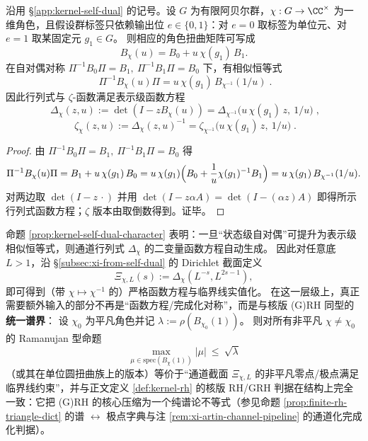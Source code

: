 \begin{proposition}\label{prop:kernel-self-dual-character}
沿用 \S\ref{app:kernel-self-dual} 的记号。设 \(G\) 为有限阿贝尔群，\(\chi:G\to\CC^\times\) 为一维角色，且假设群标签只依赖输出位 \(e\in\{0,1\}\)：对 \(e=0\) 取标签为单位元、对 \(e=1\) 取某固定元 \(g_1\in G\)。
则相应的角色扭曲矩阵可写成
\[
B_\chi(u)=B_0+u\,\chi(g_1)\,B_1.
\]
在自对偶对称 \(\Pi^{-1}B_0\Pi=B_1,\ \Pi^{-1}B_1\Pi=B_0\) 下，有相似恒等式
\[
\boxed{\;
\Pi^{-1}B_\chi(u)\Pi
=u\,\chi(g_1)\,B_{\chi^{-1}}(1/u)\; }.
\]
因此行列式与 \(\zeta\)-函数满足表示级函数方程
\[
\boxed{\;
\Delta_\chi(z,u):=\det(I-zB_\chi(u))
=\Delta_{\chi^{-1}}\!\bigl(u\,\chi(g_1)\,z,\ 1/u\bigr)\; },
\]
\[
\boxed{\;
\zeta_\chi(z,u):=\Delta_\chi(z,u)^{-1}
=\zeta_{\chi^{-1}}\!\bigl(u\,\chi(g_1)\,z,\ 1/u\bigr)\; }.
\]
\end{proposition}
\begin{proof}
由 \(\Pi^{-1}B_0\Pi=B_1,\ \Pi^{-1}B_1\Pi=B_0\) 得
\[
\Pi^{-1}B_\chi(u)\Pi
=B_1+u\,\chi(g_1)\,B_0
=u\,\chi(g_1)\Bigl(B_0+\frac{1}{u}\chi(g_1)^{-1}B_1\Bigr)
=u\,\chi(g_1)\,B_{\chi^{-1}}(1/u).
\]
对两边取 \(\det(I-z\,\cdot)\) 并用 \(\det(I-z\alpha A)=\det(I-(\alpha z)A)\) 即得所示行列式函数方程；\(\zeta\) 版本由取倒数得到。证毕。
\end{proof}

\begin{remark}\label{rem:kernel-self-dual-character-ramanujan}
命题 \ref{prop:kernel-self-dual-character} 表明：一旦“状态级自对偶”可提升为表示级相似恒等式，则通道行列式 \(\Delta_\chi\) 的二变量函数方程自动生成。
因此对任意底 \(L>1\)，沿 \S\ref{subsec:xi-from-self-dual} 的 Dirichlet 截面定义
\[
\Xi_{\chi,L}(s):=\Delta_\chi(L^{-s},L^{2s-1}),
\]
即可得到（带 \(\chi\mapsto\chi^{-1}\) 的）严格函数方程与临界线实值化。
在这一层级上，真正需要额外输入的部分不再是“函数方程/完成化对称”，而是与核版 (G)RH 同型的\textbf{统一谱界}：
设 \(\chi_0\) 为平凡角色并记 \(\lambda:=\rho(B_{\chi_0}(1))\)。
则对所有非平凡 \(\chi\neq\chi_0\) 的 Ramanujan 型命题
\[
\max_{\mu\in\mathrm{spec}(B_\chi(1))}|\mu|\ \le\ \sqrt{\lambda}
\]
（或其在单位圆扭曲族上的版本）等价于“通道截面 \(\Xi_{\chi,L}\) 的非平凡零点/极点满足临界线约束”，并与正文定义 \ref{def:kernel-rh} 的核版 RH/GRH 判据在结构上完全一致：它把 (G)RH 的核心压缩为一个纯谱论不等式（参见命题 \ref{prop:finite-rh-triangle-dict} 的谱 \(\leftrightarrow\) 极点字典与注 \ref{rem:xi-artin-channel-pipeline} 的通道化完成化判据）。
\end{remark}

